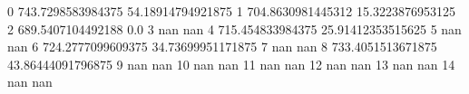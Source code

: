 0 743.7298583984375 54.18914794921875
1 704.8630981445312 15.3223876953125
2 689.5407104492188 0.0
3 nan nan
4 715.454833984375 25.91412353515625
5 nan nan
6 724.2777099609375 34.73699951171875
7 nan nan
8 733.4051513671875 43.86444091796875
9 nan nan
10 nan nan
11 nan nan
12 nan nan
13 nan nan
14 nan nan
